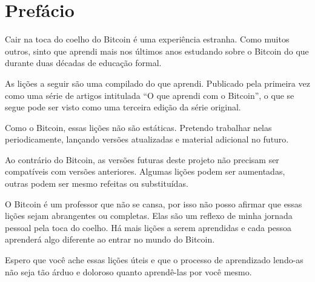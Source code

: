 \chapter*{Prefácio}

Cair na toca do coelho do Bitcoin é uma experiência estranha. Como muitos outros, sinto que aprendi mais nos últimos anos estudando sobre o Bitcoin do que durante duas décadas de educação formal.

As lições a seguir são uma compilado do que aprendi. Publicado pela primeira vez como uma série de artigos intitulada {“O que aprendi com o Bitcoin”}, o que se segue pode ser visto como uma terceira edição da série original.

Como o Bitcoin, essas lições não são estáticas. Pretendo trabalhar nelas periodicamente, lançando versões atualizadas e material adicional no futuro.

Ao contrário do Bitcoin, as versões futuras deste projeto não precisam ser compatíveis com versões anteriores. Algumas lições podem ser aumentadas, outras podem ser mesmo refeitas ou substituídas.

O Bitcoin é um professor que não se cansa, por isso não posso afirmar que essas lições sejam abrangentes ou completas. Elas são um reflexo de minha jornada pessoal pela toca do coelho. Há mais lições a serem aprendidas e cada pessoa aprenderá algo diferente ao entrar no mundo do Bitcoin.

Espero que você ache essas lições úteis e que o processo de aprendizado lendo-as não seja tão árduo e doloroso quanto aprendê-las por você mesmo.

%
%

